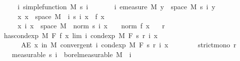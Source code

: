 \begin{isabellebody}
\ \ \ \ \ \ \ {\isachardoublequoteopen}{\isasymAnd}i{\isachardot}{\kern0pt}\ simple{\isacharunderscore}{\kern0pt}function\ M\ {\isacharparenleft}{\kern0pt}s\ i{\isacharparenright}{\kern0pt}{\isachardoublequoteclose}\isanewline
\ \ \ \ \ \ \ {\isachardoublequoteopen}{\isasymAnd}i{\isachardot}{\kern0pt}\ emeasure\ M\ {\isacharbraceleft}{\kern0pt}y\ {\isasymin}\ space\ M{\isachardot}{\kern0pt}\ s\ i\ y\ {\isasymnoteq}\ {}{\isacharbraceright}{\kern0pt}\ {\isasymnoteq}\ {\isasyminfinity}{\isachardoublequoteclose}\isanewline
\ \ \ \ \ \ \ {\isachardoublequoteopen}{\isasymAnd}x{\isachardot}{\kern0pt}\ x\ {\isasymin}\ space\ M\ {\isasymLongrightarrow}\ {\isacharparenleft}{\kern0pt}{\isasymlambda}i{\isachardot}{\kern0pt}\ s\ i\ x{\isacharparenright}{\kern0pt}\ {\isasymlonglonglongrightarrow}\ f\ x{\isachardoublequoteclose}\isanewline
\ \ \ \ \ \ \ {\isachardoublequoteopen}{\isasymAnd}x\ i{\isachardot}{\kern0pt}\ x\ {\isasymin}\ space\ M\ {\isasymLongrightarrow}\ norm\ {\isacharparenleft}{\kern0pt}s\ i\ x{\isacharparenright}{\kern0pt}\ {\isasymle}\ {}\ {\isacharasterisk}{\kern0pt}\ norm\ {\isacharparenleft}{\kern0pt}f\ x{\isacharparenright}{\kern0pt}{\isachardoublequoteclose}\isanewline
\ \ \ r\ \isanewline
\ \ \ {\isachardoublequoteopen}has{\isacharunderscore}{\kern0pt}cond{\isacharunderscore}{\kern0pt}exp\ M\ F\ f\ {\isacharparenleft}{\kern0pt}{\isasymlambda}x{\isachardot}{\kern0pt}\ lim\ {\isacharparenleft}{\kern0pt}{\isasymlambda}i{\isachardot}{\kern0pt}\ cond{\isacharunderscore}{\kern0pt}exp\ M\ F\ {\isacharparenleft}{\kern0pt}s\ {\isacharparenleft}{\kern0pt}r\ i{\isacharparenright}{\kern0pt}{\isacharparenright}{\kern0pt}\ x{\isacharparenright}{\kern0pt}{\isacharparenright}{\kern0pt}{\isachardoublequoteclose}\ \isanewline
\ \ \ \ \ \ \ \ {\isachardoublequoteopen}AE\ x\ in\ M{\isachardot}{\kern0pt}\ convergent\ {\isacharparenleft}{\kern0pt}{\isasymlambda}i{\isachardot}{\kern0pt}\ cond{\isacharunderscore}{\kern0pt}exp\ M\ F\ {\isacharparenleft}{\kern0pt}s\ {\isacharparenleft}{\kern0pt}r\ i{\isacharparenright}{\kern0pt}{\isacharparenright}{\kern0pt}\ x{\isacharparenright}{\kern0pt}{\isachardoublequoteclose}\isanewline
\ \ \ \ \ \ \ \ {\isachardoublequoteopen}strict{\isacharunderscore}{\kern0pt}mono\ r{\isachardoublequoteclose}\isanewline
%
\isadelimproof
%
\endisadelimproof
%
\isatagproof
{}\isamarkupfalse%
\ {\isacharminus}{\kern0pt}\isanewline
\ \ \isamarkupfalse%
\ {\isacharbrackleft}{\kern0pt}measurable{\isacharbrackright}{\kern0pt}{\isacharcolon}{\kern0pt}\ {\isachardoublequoteopen}{\isacharparenleft}{\kern0pt}s\ i{\isacharparenright}{\kern0pt}\ {\isasymin}\ borel{\isacharunderscore}{\kern0pt}measurable\ M{\isachardoublequoteclose}\ \ i\ \isamarkupfalse%

\end{isabellebody}

